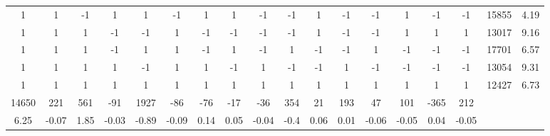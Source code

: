 \documentclass[11pt]{article}
\begin{document}
\begin{landscape}
\begin{table}[]
\begin{tabular}{|cccccccccccccccc|cc|}
		1 & 1 & -1 & 1 & 1 & -1 & 1 & 1 & -1 & -1 & 1 & -1 & -1 & 1 & -1 & -1 & 15855 & 4.19 \\
		1 & 1 & 1 & -1 & -1 & 1 & -1 & -1 & -1 & -1 & 1 & -1 & -1 & 1 & 1 & 1 & 13017 & 9.16 \\
		1 & 1 & 1 & -1 & 1 & 1 & -1 & 1 & -1 & 1 & -1 & -1 & 1 & -1 & -1 & -1 & 17701 & 6.57 \\
		1 & 1 & 1 & 1 & -1 & 1 & 1 & -1 & 1 & -1 & -1 & 1 & -1 & -1 & -1 & -1 & 13054 & 9.31 \\
		1 & 1 & 1 & 1 & 1 & 1 & 1 & 1 & 1 & 1 & 1 & 1 & 1 & 1 & 1 & 1 & 12427 & 6.73 \\ \hline
		14650 & 221 & 561 & -91 & 1927 & -86 & -76 & -17 & -36 & 354 & 21 & 193 & 47 & 101 & -365 & 212 \\
		6.25 & -0.07 & 1.85 & -0.03 & -0.89 & -0.09 & 0.14 & 0.05 & -0.04 & -0.4 & 0.06 & 0.01 & -0.06 & -0.05 & 0.04 & -0.05
	\end{tabular}
\end{table}
\end{landscape}
\end{document}
